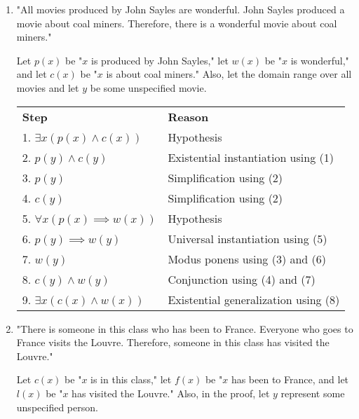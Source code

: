 \documentclass[11pt]{article}
\begin{document}
\begin{enumerate}[label=\textbf{\arabic*.}]
\begin{enumerate}[label=\textbf{\alph*)}]
		\vspace{1cm}
		\item "All movies produced by John Sayles are wonderful. John Sayles produced a movie about coal miners. Therefore, there is a wonderful movie about coal miners."
		
		Let $p(x)$ be "$x$ is produced by John Sayles," let $w(x)$ be "$x$ is wonderful," and let $c(x)$ be "$x$ is about coal miners." Also, let the domain range over all movies and let $y$ be some unspecified movie.
		
		\begin{center}
		\begin{tabular}{ll}
			\textbf{Step} & \textbf{Reason} \\
			1. $\exists x(p(x) \land c(x))$ & Hypothesis \\
			2. $p(y) \land c(y)$ & Existential instantiation using (1) \\
			3. $p(y)$ & Simplification using (2) \\
			4. $c(y)$ & Simplification using (2) \\
			5. $\forall x(p(x) \implies w(x))$ & Hypothesis \\
			6. $p(y) \implies w(y)$ & Universal instantiation using (5) \\
			7. $w(y)$ & Modus ponens using (3) and (6) \\
			8. $c(y) \land w(y)$ & Conjunction using (4) and (7) \\
			9. $\exists x(c(x) \land w(x))$ & Existential generalization using (8)
		\end{tabular}
		\end{center}
		
		\item "There is someone in this class who has been to France. Everyone who goes to France visits the Louvre. Therefore, someone in this class has visited the Louvre."
		
		Let $c(x)$ be "$x$ is in this class," let $f(x)$ be "$x$ has been to France, and let $l(x)$ be "$x$ has visited the Louvre." Also, in the proof, let $y$ represent some unspecified person.
		

\end{enumerate}
\end{enumerate}
\end{document}
